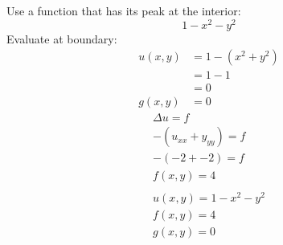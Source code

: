 \documentclass[letterpaper,11pt]{article}
\begin{document}
    Use a function that has its peak at the interior:
    \[
        1-x^2-y^2
    \]
    Evaluate at boundary:
    \begin{align*}
        u(x,y) &= 1 - (x^2 + y^2)\\
        &= 1 - 1\\
        &= 0\\
        g(x,y) &= 0
    \end{align*}
    \begin{gather*}
        \Delta u = f \\
        -(u_{xx} + y_{yy}) = f\\
        -(-2 + -2) = f\\
        f(x,y) = 4\\
        \\
        u(x,y) = 1 - x^2 - y^2\\
        f(x,y) = 4\\
        g(x,y) = 0\\
    \end{gather*}
    \newpage
\end{document}
